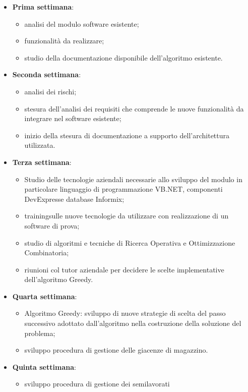 \begin{itemize}
	\item \textbf{Prima settimana}:
	\begin{itemize}
		 \item analisi del modulo software esistente;
		 \item funzionalità da realizzare;
	 	 \item studio della documentazione disponibile dell’algoritmo esistente.
	\end{itemize}
	\item \textbf{Seconda settimana}: 
	\begin{itemize}
		\item analisi dei rischi;
		\item stesura dell'analisi dei requisiti che comprende le nuove funzionalità da integrare nel software esistente;
		\item  inizio della stesura di documentazione a supporto dell'architettura utilizzata.
	\end{itemize}
	\item \textbf{Terza settimana}:
		\begin{itemize}
		\item Studio delle tecnologie aziendali necessarie allo sviluppo del
		modulo in particolare linguaggio di programmazione VB.NET\glo, componenti
		DevExpress\glosp e database Informix\glo;
		\item  training\glosp sulle nuove tecnologie da utilizzare con realizzazione di un software di prova;
		\item studio di algoritmi e tecniche di Ricerca Operativa e	Ottimizzazione Combinatoria;
		\item riunioni col tutor aziendale per decidere le scelte implementative dell'algoritmo Greedy.
	\end{itemize}
	\item \textbf{Quarta settimana}:
		\begin{itemize}
		\item Algoritmo Greedy: sviluppo di nuove strategie di scelta
		del passo successivo adottato dall’algoritmo nella
		costruzione della soluzione del problema;
		\item sviluppo procedura di gestione delle giacenze di
		magazzino.
		\end{itemize}
	\item \textbf{Quinta settimana}:
		\begin{itemize}
		\item sviluppo procedura di gestione dei semilavorati

\end{itemize}
\end{itemize}
